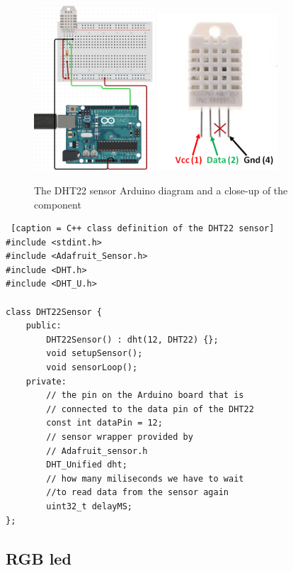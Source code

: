 \documentclass[12pt]{article}
\begin{document}
	\begin{figure}[ht]
		\centering
		\includegraphics[width=0.4\textwidth]{diag_dht22.png}
		\includegraphics[width=0.4\textwidth]{dht.png}
		\caption{The DHT22 sensor Arduino diagram and a close-up of the component}
		\label{fig:DHT22}
	\end{figure}
	
	\begin{lstlisting} [caption = C++ class definition of the DHT22 sensor]
#include <stdint.h>
#include <Adafruit_Sensor.h>
#include <DHT.h>
#include <DHT_U.h>

class DHT22Sensor {
	public:
		DHT22Sensor() : dht(12, DHT22) {};
		void setupSensor();
		void sensorLoop();
	private:
		// the pin on the Arduino board that is 
		// connected to the data pin of the DHT22
		const int dataPin = 12;
		// sensor wrapper provided by 
		// Adafruit_sensor.h
		DHT_Unified dht;
		// how many miliseconds we have to wait 
		//to read data from the sensor again
		uint32_t delayMS;
};
	\end{lstlisting}
	
	\clearpage
	
	\subsection{RGB led}
	
\end{document}
